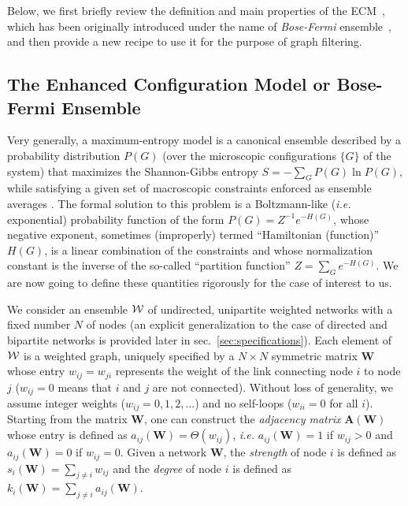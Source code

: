 \documentclass[aps,twocolumn,superscriptaddress]{revtex4-1}
\newcommand{\ie}{\emph{i.e.} }
\begin{document}
Below, we first briefly review the definition and main properties of the ECM~\cite{mastrandrea-njp-2014,squartini-njp-2015}, which has been originally introduced under the name of \emph{Bose-Fermi} ensemble~\cite{bose-fermi}, and then provide a new recipe to use it for the purpose of graph filtering. 

\subsection{The Enhanced Configuration Model or Bose-Fermi Ensemble}
Very generally, a maximum-entropy model is a canonical ensemble described by a probability distribution $P(G)$ (over the microscopic configurations $\{G\}$ of the system) that maximizes the Shannon-Gibbs entropy $S=-\sum_{G}P(G)\ln P(G)$, while satisfying a given set of macroscopic constraints enforced as ensemble averages \cite{park-pre-2004}. The formal solution to this problem is a Boltzmann-like (\ie exponential) probability function of the form $P(G)=Z^{-1}e^{-H(G)}$, whose negative exponent, sometimes (improperly) termed ``Hamiltonian (function)'' $H(G)$, is a linear combination of the constraints and whose normalization constant is the inverse of the so-called ``partition function'' $Z=\sum_G e^{-H(G)}$. We are now going to define these quantities rigorously for the case of interest to us.

We consider an ensemble ${\cal W}$ of undirected, unipartite weighted networks with a fixed number $N$ of nodes (an explicit generalization to the case of directed and bipartite networks is provided later in sec.~\ref{sec:specifications}).
Each element of $\cal{W}$ is a weighted graph, uniquely specified by a $N\times N$ symmetric matrix $\bm{W}$ whose entry $w_{ij}=w_{ji}$ represents the weight of the link connecting node $i$ to node $j$ ($w_{ij}=0$ means that $i$ and $j$ are not connected). Without loss of generality, we assume integer weights ($w_{ij}=0,1,2,\dots$) and no self-loops ($w_{ii}=0$ for all $i$). 
Starting from the matrix $\bm{W}$, one can construct the \emph{adjacency matrix} $\bm{A}(\bm{W})$ whose entry is defined as $a_{ij}(\bm{W})=\Theta(w_{ij})$, \ie $a_{ij}(\bm{W})=1$ if $w_{ij}>0$ and $a_{ij}(\bm{W})=0$ if $w_{ij}=0$.
Given a network $\bm{W}$, the \emph{strength} of node $i$ is defined as $s_i(\bm{W})=\sum_{j\ne i} w_{ij}$ and the \emph{degree} of node $i$ is defined as $k_i(\bm{W})=\sum_{j\ne i}a_{ij}(\bm{W})$.
\end{document}
